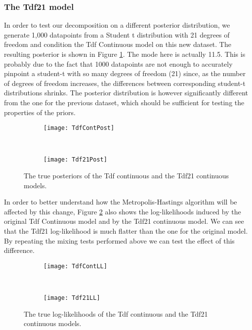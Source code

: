 \subsubsection{The Tdf21 model}
In order to test our decomposition on a different posterior distribution, we generate 1,000 datapoints from a Student t distribution with 21 degrees of freedom and condition the Tdf Continuous model on this new dataset. The resulting posterior is shown in Figure \ref{fig:tdfPPost}. The mode here is actually 11.5. This is probably due to the fact that 1000 datapoints are not enough to accurately pinpoint a student-t with so many degrees of freedom (21) since, as the number of degrees of freedom increases, the differences between corresponding student-t distributions shrinks. The posterior distribution is however significantly different from the one for the previous dataset, which should be sufficient for testing the properties of the priors.

\begin{figure}[h]
    \centering
    \begin{subfigure}[t]{0.48\textwidth}
      \texttt{[image: TdfContPost]}
    \end{subfigure}
    ~
    \begin{subfigure}[t]{0.48\textwidth}
      \texttt{[image: Tdf21Post]}
    \end{subfigure}
    \caption{The true posteriors of the Tdf continuous and the Tdf21 continuous models.}
    \label{fig:tdfPPost}
\end{figure}

In order to better understand how the Metropolis-Hastings algorithm will be affected by this change, Figure \ref{fig:tdfPLL} also shows the log-likelihoods induced by the original Tdf Continuous model and by the Tdf21 continuous model. We can see that the Tdf21 log-likelihood is much flatter than the one for the original model. By repeating the mixing tests performed above we can test the effect of this difference.

\begin{figure}[h]
    \centering
    \begin{subfigure}[t]{0.48\textwidth}
      \texttt{[image: TdfContLL]}
    \end{subfigure}
    ~
    \begin{subfigure}[t]{0.48\textwidth}
      \texttt{[image: Tdf21LL]}
    \end{subfigure}
    \caption{The true log-likelihoods of the Tdf continuous and the Tdf21 continuous models.}
    \label{fig:tdfPLL}
\end{figure}

